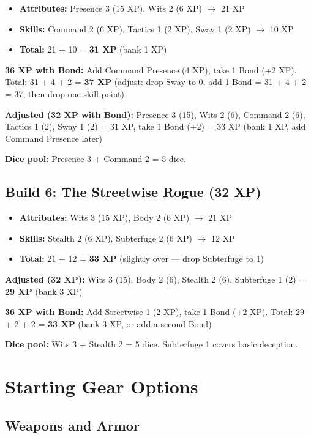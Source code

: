 \begin{itemize}
  \item \textbf{Attributes:} Presence 3 (15 XP), Wits 2 (6 XP) $\rightarrow$ 21 XP
  \item \textbf{Skills:} Command 2 (6 XP), Tactics 1 (2 XP), Sway 1 (2 XP) $\rightarrow$ 10 XP
  \item \textbf{Total:} 21 + 10 = \textbf{31 XP} (bank 1 XP)
\end{itemize}

\textbf{36 XP with Bond:} Add Command Presence (4 XP), take 1 Bond (+2 XP). Total: 31 + 4 + 2 = \textbf{37 XP} (adjust: drop Sway to 0, add 1 Bond = 31 + 4 + 2 = 37, then drop one skill point)

\textbf{Adjusted (32 XP with Bond):} Presence 3 (15), Wits 2 (6), Command 2 (6), Tactics 1 (2), Sway 1 (2) = 31 XP, take 1 Bond (+2) = 33 XP (bank 1 XP, add Command Presence later)

\textbf{Dice pool:} Presence 3 + Command 2 = 5 dice.

\subsection{Build 6: The Streetwise Rogue (32 XP)}

\begin{itemize}
  \item \textbf{Attributes:} Wits 3 (15 XP), Body 2 (6 XP) $\rightarrow$ 21 XP
  \item \textbf{Skills:} Stealth 2 (6 XP), Subterfuge 2 (6 XP) $\rightarrow$ 12 XP
  \item \textbf{Total:} 21 + 12 = \textbf{33 XP} (slightly over — drop Subterfuge to 1)
\end{itemize}

\textbf{Adjusted (32 XP):} Wits 3 (15), Body 2 (6), Stealth 2 (6), Subterfuge 1 (2) = \textbf{29 XP} (bank 3 XP)

\textbf{36 XP with Bond:} Add Streetwise 1 (2 XP), take 1 Bond (+2 XP). Total: 29 + 2 + 2 = \textbf{33 XP} (bank 3 XP, or add a second Bond)

\textbf{Dice pool:} Wits 3 + Stealth 2 = 5 dice. Subterfuge 1 covers basic deception.

\section{Starting Gear Options}

\subsection*{Weapons and Armor}

